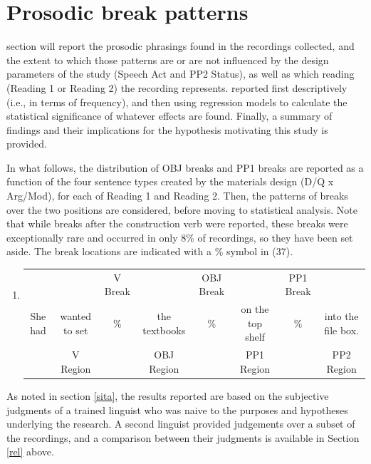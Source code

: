 \documentclass[12pt,oneside]{book}
\providecommand{\tightlist}{%
  \setlength{\itemsep}{0pt}\setlength{\parskip}{0pt}}
\begin{document}
\hypertarget{results-prosody}{%
\section{Prosodic break patterns}\label{results-prosody}}

 section will report the prosodic phrasings found in the recordings collected, and the extent to which those patterns are or are not influenced by the design parameters of the study (Speech Act and PP2 Status), as well as which reading (Reading 1 or Reading 2) the recording represents.  reported first descriptively (i.e., in terms of frequency), and then using regression models to calculate the statistical significance of whatever effects are found. Finally, a summary of findings and their implications for the hypothesis motivating this study is provided.

In what follows, the distribution of OBJ breaks and PP1 breaks are reported as a function of the four sentence types created by the materials design (D/Q x Arg/Mod), for each of Reading 1 and Reading 2. Then, the patterns of breaks over the two positions are considered, before moving to statistical analysis. Note that while breaks after the  construction verb were reported, these breaks were exceptionally rare and occurred in only 8\% of recordings, so they have been set aside. The break locations are indicated with a \% symbol in (37).

\begin{enumerate}
\def\labelenumi{(\arabic{enumi})}
\setcounter{enumi}{36}
\tightlist
\item
  \begingroup
  \setlength{\tabcolsep}{1pt}

  \begin{tabular}{cccccccc}
    & & \footnotesize V Break & & \footnotesize OBJ Break & & \footnotesize PP1 Break & \\
    She had & wanted to set & \% & the textbooks & \% & on the top shelf & \% & into the file box. \\
    \cmidrule(r){2-2} \cmidrule(r){4-4} \cmidrule(r){6-6} \cmidrule(r){8-8} 
    & \footnotesize V Region & & \footnotesize OBJ Region & & \footnotesize PP1 Region & & PP2 Region \\
  \end{tabular}
    \endgroup
\end{enumerate}

As noted in section \ref{sita}, the results reported are based on the subjective judgments of a trained linguist who was naive to the purposes and hypotheses underlying the research. A second linguist provided judgements over a subset of the recordings, and a comparison between their judgments is available in Section \ref{rel} above.
\end{document}
